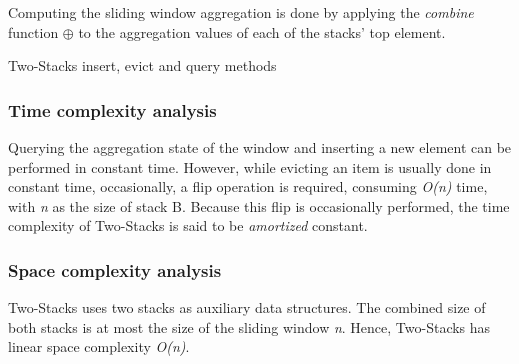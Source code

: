 Computing the sliding window aggregation is done by applying the \textit{combine} function $\oplus$ to the aggregation values of each of the stacks' top element. 

\begin{algorithm}
    \caption{Two-Stacks insert, evict and query methods}
    \label{pseudo:2-stacks}
    \begin{algorithmic}[1]
            \State \Return{$\overline{\theta}$} 
        \Else 
            \State {} 
        \EndIf
        \EndFunction
        
            \State {}
        \EndFunction
        
        
        \EndFunction
        
        
        
             
                \EndWhile
            \EndIf
        \EndFunction
    \end{algorithmic}
\end{algorithm}

\subsubsection*{Time complexity analysis}
Querying the aggregation state of the window and inserting a new element can be performed in constant time. However, while evicting an item is usually done in constant time, occasionally, a flip operation is required, consuming \textit{O(n)} time, with \textit{n} as the size of stack B. Because this flip is occasionally performed, the time complexity of Two-Stacks is said to be \textit{amortized} constant.

\subsubsection*{Space complexity analysis}
Two-Stacks uses two stacks as auxiliary data structures. The combined size of both stacks is at most the size of the sliding window \textit{n}. Hence, Two-Stacks has linear space complexity \textit{O(n)}.

